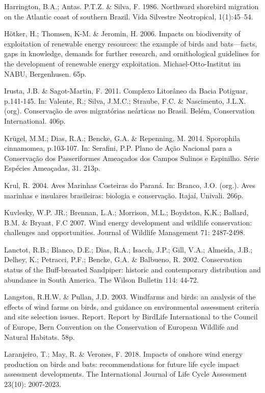 \documentclass[
  oneside]{scrbook}
\begin{document}
Harrington, B.A.; Antas. P.T.Z. \& Silva, F. 1986. Northward shorebird migration on the Atlantic coast of southern Brazil. Vida Silvestre Neotropical, 1(1):45--54.

Hötker, H.; Thomsen, K-M. \& Jeromin, H. 2006. Impacts on biodiversity of exploitation of renewable energy resources: the example of birds and bats---facts, gaps in knowledge, demands for further research, and ornithological guidelines for the development of renewable energy exploitation. Michael-Otto-Institut im NABU, Bergenhusen. 65p.

Irusta, J.B. \& Sagot-Martin, F. 2011. Complexo Litorâneo da Bacia Potiguar, p.141-145. In: Valente, R.; Silva, J.M.C.; Straube, F.C. \& Nascimento, J.L.X. (org). Conservação de aves migratórias neárticas no Brasil. Belém, Conservation International. 406p.

Krügel, M.M.; Dias, R.A.; Bencke, G.A. \& Repenning, M. 2014. Sporophila cinnamomea, p.103-107. In: Serafini, P.P. Plano de Ação Nacional para a Conservação dos Passeriformes Ameaçados dos Campos Sulinos e Espinilho. Série Espécies Ameaçadas, 31. 213p.

Krul, R. 2004. Aves Marinhas Costeiras do Paraná. In: Branco, J.O. (org.). Aves marinhas e insulares brasileiras: biologia e conservação. Itajaí, Univali. 266p.

Kuvlesky, W.P. JR.; Brennan, L.A.; Morrison, M.L.; Boydston, K.K.; Ballard, B.M. \& Bryant, F.C 2007. Wind energy development and wildlife conservation: challenges and opportunities. Journal of Wildlife Management 71: 2487-2498.

Lanctot, R.B.; Blanco, D.E.; Dias, R.A.; Isacch, J.P.; Gill, V.A.; Almeida, J.B.; Delhey, K.; Petracci, P.F.; Bencke, G.A. \& Balbueno, R. 2002. Conservation status of the Buff-breasted Sandpiper: historic and contemporary distribution and abundance in South America. The Wilson Bulletin 114: 44-72.

Langston, R.H.W. \& Pullan, J.D. 2003. Windfarms and birds: an analysis of the effects of wind farms on birds, and guidance on environmental assessment criteria and site selection issues. Report. Report by BirdLife International to the Council of Europe, Bern Convention on the Conservation of European Wildlife and Natural Habitats. 58p.

Laranjeiro, T.; May, R. \& Verones, F. 2018. Impacts of onshore wind energy production on birds and bats: recommendations for future life cycle impact assessment developments. The International Journal of Life Cycle Assessment 23(10): 2007-2023.
\end{document}

